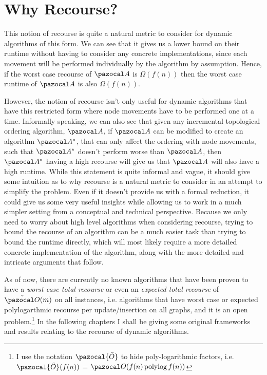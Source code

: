 \documentclass{report}
\DeclareMathOperator*{\polylog}{polylog}
\begin{document}
\section{Why Recourse?}

This notion of recourse is quite a natural metric to consider for dynamic algorithms of this form. We can see that it gives us a lower bound on their runtime without having to consider any concrete implementations, since each movement will be performed individually by the algorithm by assumption. Hence, if the worst case recourse of $\pazocal A$ is $\Omega(f(n))$ then the worst case runtime of $\pazocal A$ is also $\Omega(f(n))$.

However, the notion of recourse isn't only useful for dynamic algorithms that have this restricted form where node movements have to be performed one at a time. Informally speaking, we can also see that given any incremental topological ordering algorithm, $\pazocal A$, if $\pazocal A$ can be modified to create an algorithm $\pazocal A^*$, that can only affect the ordering with node movements, such that $\pazocal A^*$ doesn't perform worse than $\pazocal A$, then $\pazocal A^*$ having a high recourse will give us that $\pazocal A$ will also have a high runtime. While this statement is quite informal and vague, it should give some intuition as to why recourse is a natural metric to consider in an attempt to simplify the problem. Even if it doesn't provide us with a formal reduction, it could give us some very useful insights while allowing us to work in a much simpler setting from a conceptual and technical perspective. Because we only need to worry about high level algorithms when considering recourse, trying to bound the recourse of an algorithm can be a much easier task than trying to bound the runtime directly, which will most likely require a more detailed concrete implementation of the algorithm, along with the more detailed and intricate arguments that follow.

As of now, there are currently no known algorithms that have been proven to have a \textit{worst case total recourse} or even an \textit{expected total recourse} of $\tilde {\pazocal O}(m)$ on all instances, i.e. algorithms that have worst case or expected polylogarthmic recourse per update/insertion on all graphs, and it is an open problem.\footnote{I use the notation $\pazocal{\tilde{O}}$ to hide poly-logarithmic factors, i.e. $\pazocal{\tilde{O}}(f(n))$ = $\pazocal O (f(n) \polylog f(n))$} In the following chapters I shall be giving some original frameworks and results relating to the recourse of dynamic algorithms.
\end{document}

